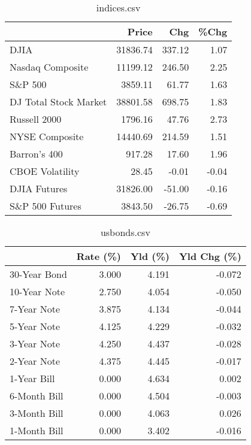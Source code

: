 \documentclass{article}%
\begin{document}
%


\begin{table}[htbp]%
\caption{indices.csv}%
\centering%
\begin{adjustbox}{width=1\textwidth}%
\begin{tabular}{lrrr}
\toprule
                      &    Price &    Chg &  \%Chg \\
\midrule
                 DJIA & 31836.74 & 337.12 &  1.07 \\
     Nasdaq Composite & 11199.12 & 246.50 &  2.25 \\
              S\&P 500 &  3859.11 &  61.77 &  1.63 \\
DJ Total Stock Market & 38801.58 & 698.75 &  1.83 \\
         Russell 2000 &  1796.16 &  47.76 &  2.73 \\
       NYSE Composite & 14440.69 & 214.59 &  1.51 \\
         Barron's 400 &   917.28 &  17.60 &  1.96 \\
      CBOE Volatility &    28.45 &  -0.01 & -0.04 \\
         DJIA Futures & 31826.00 & -51.00 & -0.16 \\
      S\&P 500 Futures &  3843.50 & -26.75 & -0.69 \\
\bottomrule
\end{tabular}
%
\end{adjustbox}%
\end{table}

%


\begin{table}[htbp]%
\caption{usbonds.csv}%
\centering%
\begin{adjustbox}{width=1\textwidth}%
\begin{tabular}{lrrr}
\toprule
             &  Rate (\%) &  Yld (\%) &  Yld Chg (\%) \\
\midrule
30-Year Bond &     3.000 &    4.191 &       -0.072 \\
10-Year Note &     2.750 &    4.054 &       -0.050 \\
 7-Year Note &     3.875 &    4.134 &       -0.044 \\
 5-Year Note &     4.125 &    4.229 &       -0.032 \\
 3-Year Note &     4.250 &    4.437 &       -0.028 \\
 2-Year Note &     4.375 &    4.445 &       -0.017 \\
 1-Year Bill &     0.000 &    4.634 &        0.002 \\
6-Month Bill &     0.000 &    4.504 &       -0.003 \\
3-Month Bill &     0.000 &    4.063 &        0.026 \\
1-Month Bill &     0.000 &    3.402 &       -0.016 \\
\bottomrule
\end{tabular}
%
\end{adjustbox}%
\end{table}
\end{document}
